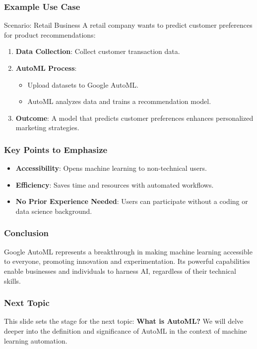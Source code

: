 \documentclass[aspectratio=169]{beamer}
\begin{document}
\begin{frame}[fragile]
    \frametitle{Example Use Case}
    \begin{block}{Scenario: Retail Business}
        A retail company wants to predict customer preferences for product recommendations:
    \end{block}
    \begin{enumerate}
        \item \textbf{Data Collection}: Collect customer transaction data.
        \item \textbf{AutoML Process}: 
            \begin{itemize}
                \item Upload datasets to Google AutoML.
                \item AutoML analyzes data and trains a recommendation model.
            \end{itemize}
        \item \textbf{Outcome}: A model that predicts customer preferences enhances personalized marketing strategies.
    \end{enumerate}
\end{frame}

\begin{frame}[fragile]
    \frametitle{Key Points to Emphasize}
    \begin{itemize}
        \item \textbf{Accessibility}: Opens machine learning to non-technical users.
        \item \textbf{Efficiency}: Saves time and resources with automated workflows.
        \item \textbf{No Prior Experience Needed}: Users can participate without a coding or data science background.
    \end{itemize}
\end{frame}

\begin{frame}[fragile]
    \frametitle{Conclusion}
    Google AutoML represents a breakthrough in making machine learning accessible to everyone, promoting innovation and experimentation. Its powerful capabilities enable businesses and individuals to harness AI, regardless of their technical skills.
\end{frame}

\begin{frame}[fragile]
    \frametitle{Next Topic}
    This slide sets the stage for the next topic: \textbf{What is AutoML?} We will delve deeper into the definition and significance of AutoML in the context of machine learning automation.
\end{frame}
\end{document}
